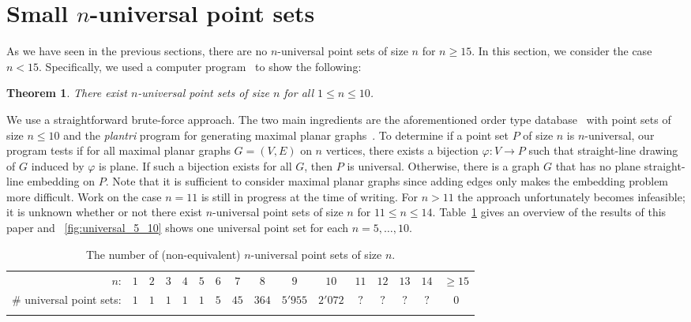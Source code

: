 \documentclass[11pt]{article}
\newtheorem{theorem}[equation]{Theorem}
\begin{document}
\section{Small $n$-universal point sets}
\label{sec:small}

As we have seen in the previous sections, there are no $n$-universal point sets
of size $n$ for $n\geq 15$. In this section, we consider the case $n<15$.
Specifically, we used a computer program~\cite{universalsrc} to show the
following:
\begin{theorem}
  \label{thm:at_most_10}
  There exist $n$-universal point sets of size $n$ for all $1\leq n\leq 10$.
\end{theorem}
We use a straightforward brute-force approach. The two main ingredients are the
aforementioned order type database~\cite{ak-psotd-01} with point sets of size
$n\leq 10$ and the \emph{plantri} program for generating maximal planar
graphs~\cite{brinkmann2007fast,plantrisrc}. To determine if a point set $P$ of
size $n$ is $n$-universal, our program tests if for all maximal planar graphs
$G=(V,E)$ on $n$ vertices, there exists a bijection $\varphi : V\rightarrow P$ such
that straight-line drawing of $G$ induced by $\varphi$ is plane. If such a
bijection exists for all $G$, then $P$ is universal. Otherwise, there is a graph
$G$ that has no plane straight-line embedding on $P$. Note that it is sufficient
to consider maximal planar graphs since adding edges only makes the embedding
problem more difficult. Work on the case $n=11$ is still in progress at the time
of writing. For $n>11$ the approach unfortunately becomes infeasible; it is
unknown whether or not there exist $n$-universal point sets of size $n$ for
$11\leq n\leq 14$. Table~\ref{tab:ups_numbers} gives an overview of the results
of this paper and \figurename~\ref{fig:universal_5_10} shows one universal point
set for each $n=5,\dots,10$.

\begin{table}
  \centering
  \setlength{\tabcolsep}{2.5pt}
  \begin{tabular}{@{}r*{15}{c}@{}}
    \toprule $n$: & $1$ & $2$ & $3$ & $4$ & $5$ & $6$ & $7$ & $8$ & $9$ & $10$ & $11$ & $12$ &
    $13$ & $14$ & $\geq 15$\\
    \# universal point sets: & $1$ & $1$ & $1$ & $1$ & $1$ & $5$ & $45$ & $364$ & $5'955$ & $2'072$ & $?$ &
    $?$ & $?$ & $?$ & $0$\\
    \bottomrule\\
  \end{tabular}
  \caption{The number of (non-equivalent) $n$-universal point sets of size $n$.}
  \label{tab:ups_numbers}
\end{table}
\end{document}

